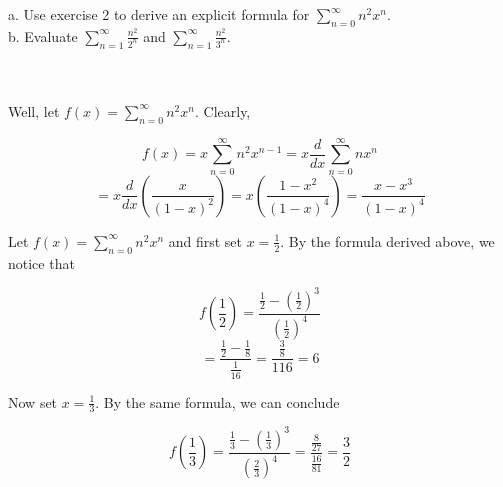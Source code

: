 a. Use exercise 2 to derive an explicit formula for $\sum_{n=0}^{\infty}n^2x^n$.\\

b. Evaluate $\sum_{n=1}^{\infty}\frac{n^2}{2^n}$ and $\sum_{n=1}^{\infty}\frac{n^2}{3^n}$.\\\\

\begin{solution}\renewcommand{\qedsymbol}{}\ \\
    Well, let $f(x)=\sum_{n=0}^{\infty}n^2x^n$. Clearly,
    
    $$f(x)=x\sum_{n=0}^{\infty}n^2x^{n-1}=x\frac{d}{dx}\sum_{n=0}^{\infty}nx^n$$
    $$=x\frac{d}{dx}(\frac{x}{(1-x)^2})=x(\frac{1-x^2}{(1-x)^4})=\frac{x-x^3}{(1-x)^4}$$

    Let $f(x)=\sum_{n=0}^{\infty}n^2x^n$ and first set $x=\frac12$. By the formula derived above, we
    notice that
    
    $$f(\frac12)=\frac{\frac12-(\frac12)^3}{(\frac12)^4}$$
    $$=\frac{\frac12-\frac18}{\frac{1}{16}}=\frac{\frac38}{{1}{16}}=6$$
    
    Now set $x=\frac13$. By the same formula, we can conclude
    
    $$f(\frac13)=\frac{\frac13-(\frac13)^3}{(\frac23)^4}=\frac{\frac{8}{27}}{\frac{16}{81}}=\frac32$$

\end{solution}